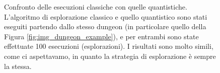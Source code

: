 \documentclass{book}
\theoremstyle{definition}
\theoremstyle{definition}
\theoremstyle{definition}
\theoremstyle{plain}
\theoremstyle{plain}
\theoremstyle{plain}
\theoremstyle{plain}
\begin{document}
\begin{figure}[H]
    \captionsetup{font=scriptsize}
    \centering
    \qquad
    \caption{\scriptsize Confronto delle esecuzioni classiche con quelle quantistiche. L'algoritmo di esplorazione classico e quello quantistico sono stati eseguiti partendo dallo stesso dungeon (in particolare quello della Figura \ref{fig:img_dungeon_example}), e per entrambi sono state effettuate 100 esecuzioni (esplorazioni). I risultati sono molto simili, come ci aspettavamo, in quanto la strategia di esplorazione è sempre la stessa.}\label{fig:histogram_comparison}
\end{figure}
\end{document}
